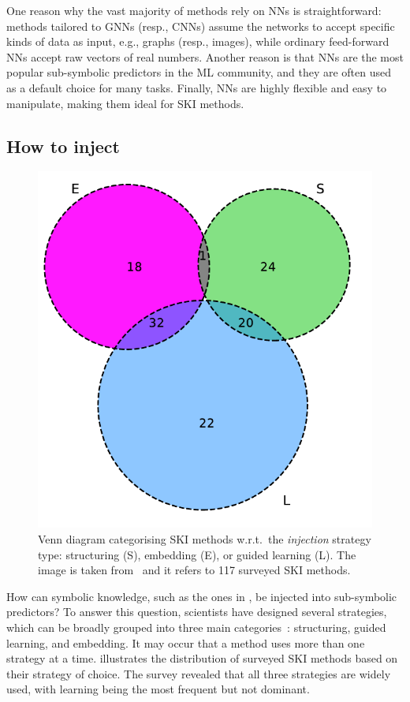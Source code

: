 One reason why the vast majority of methods rely on \glspl{NN} is straightforward: methods tailored to \glspl{GNN} (resp., \glspl{CNN}) assume the networks to accept specific kinds of data as input, e.g., graphs (resp., images), while ordinary feed-forward \glspl{NN} accept raw vectors of real numbers.
%
Another reason is that \glspl{NN} are the most popular sub-symbolic predictors in the \gls{ML} community, and they are often used as a default choice for many tasks.
%
Finally, \glspl{NN} are highly flexible and easy to manipulate, making them ideal for \gls{SKI} methods.


\subsection{How to inject}\label{subsec:how-to-inject}
%
\begin{figure}
    \centering
    \includegraphics[width=.4\linewidth]{figures/ski-integration}
    \caption[Venn diagram categorising SKI methods]{
        Venn diagram categorising SKI methods w.r.t.\ the \emph{injection} strategy type: structuring (S), embedding (E), or guided learning (L).
        The image is taken from~\cite{DBLP:journals/csur/CiattoSAMO24} and it refers to 117 surveyed \gls{SKI} methods.
    }
    \label{fig:pie-ski-injection}
\end{figure}
%
How can symbolic knowledge, such as the ones in , be injected into sub-symbolic predictors?
%
To answer this question, scientists have designed several strategies, which can be broadly grouped into three main categories~\cite{DBLP:journals/csur/CiattoSAMO24}: structuring, guided learning, and embedding.
%
It may occur that a method uses more than one strategy at a time.
%
 illustrates the distribution of surveyed \gls{SKI} methods based on their strategy of choice.
%
The survey revealed that all three strategies are widely used, with learning being the most frequent but not dominant.


